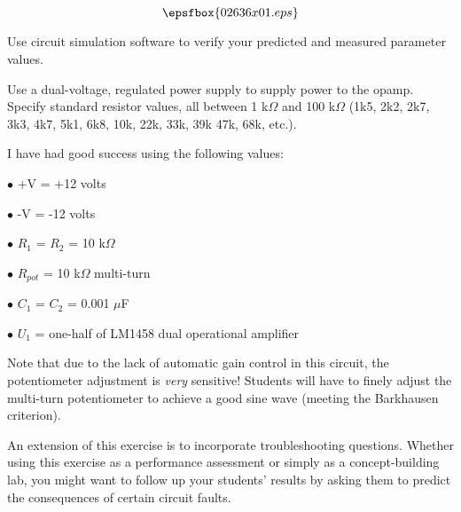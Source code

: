 

$$\epsfbox{02636x01.eps}$$

\vfil \eject






Use circuit simulation software to verify your predicted and measured parameter values.







Use a dual-voltage, regulated power supply to supply power to the opamp.  Specify standard resistor values, all between 1 k$\Omega$ and 100 k$\Omega$ (1k5, 2k2, 2k7, 3k3, 4k7, 5k1, 6k8, 10k, 22k, 33k, 39k 47k, 68k, etc.).

I have had good success using the following values:

\medskip
\item{$\bullet$} +V = +12 volts
\item{$\bullet$} -V = -12 volts
\item{$\bullet$} $R_1$ = $R_2$ = 10 k$\Omega$
\item{$\bullet$} $R_{pot}$ = 10 k$\Omega$ multi-turn
\item{$\bullet$} $C_1$ = $C_2$ = 0.001 $\mu$F
\item{$\bullet$} $U_1$ = one-half of LM1458 dual operational amplifier
\medskip

Note that due to the lack of automatic gain control in this circuit, the potentiometer adjustment is {\it very} sensitive!  Students will have to finely adjust the multi-turn potentiometer to achieve a good sine wave (meeting the Barkhausen criterion).

An extension of this exercise is to incorporate troubleshooting questions.  Whether using this exercise as a performance assessment or simply as a concept-building lab, you might want to follow up your students' results by asking them to predict the consequences of certain circuit faults.




